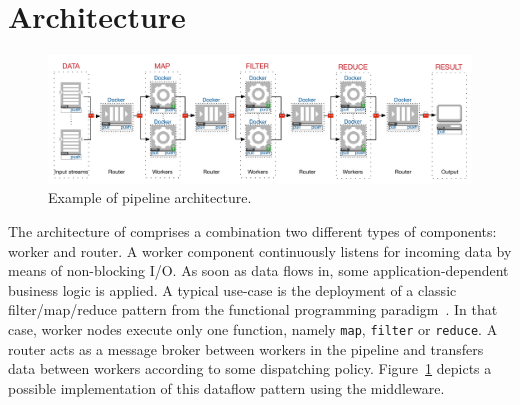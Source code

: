 \section{Architecture}
\label{sec:architecture}
\begin{figure}[!t]
  \centering
  \includegraphics[scale=0.5]{images/architecture_pipeline}
  \caption{Example of \SYS pipeline architecture.}
  \label{fig:architecture_pipeline}
\end{figure}


The architecture of \SYS{} comprises a combination two different types of components: \textsf{worker} and \textsf{router}.
A worker component continuously listens for incoming data by means of non-blocking I/O.
As soon as data flows in, some application-dependent business logic is applied.
A typical use-case is the deployment of a classic filter/map/reduce pattern from the functional programming paradigm~\cite{bird_introduction_1988}.
In that case, worker nodes execute only one function, namely \texttt{map}, \texttt{filter} or \texttt{reduce}.
A router acts as a message broker between workers in the pipeline and transfers data between workers according to some dispatching policy.
Figure~\ref{fig:architecture_pipeline} depicts a possible implementation of this dataflow pattern using the \SYS middleware.

